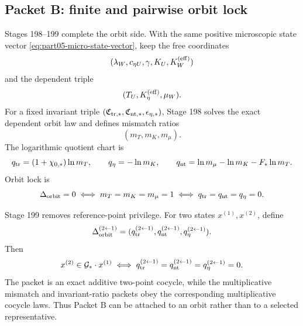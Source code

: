 \subsection{Packet B: finite and pairwise orbit lock}
Stages 198--199 complete the orbit side.  With the same positive microscopic state vector \eqref{eq:part05-micro-state-vector}, keep the free coordinates
\begin{equation}
\label{eq:part05-free-coords}
(\lambda_W,c_{\eta U},\gamma,K_U,K_W^{({\rm eff})})
\end{equation}
and the dependent triple
\begin{equation}
\label{eq:part05-dependent-triple}
(T_U,K_\eta^{({\rm eff})},\mu_W).
\end{equation}
For a fixed invariant triple \((\mathfrak C_{{\rm tr},*},\mathfrak C_{{\rm nt},*},\epsilon_{\eta,*})\), Stage 198 solves the exact dependent orbit law and defines mismatch ratios
\begin{equation}
\label{eq:part05-mismatch-triple}
(m_T,m_K,m_\mu).
\end{equation}
The logarithmic quotient chart is
\begin{equation}
\label{eq:part05-log-chart-mismatches}
q_{\rm tr}=(1+\chi_{0,*})\ln m_T,
\qquad
q_\eta=-\ln m_K,
\qquad
q_{\rm nt}=\ln m_\mu-\ln m_K-F_*\ln m_T.
\end{equation}
Orbit lock is
\begin{equation}
\label{eq:part05-single-orbit-lock}
\Delta_{\rm orbit}=0
\iff
m_T=m_K=m_\mu=1
\iff
q_{\rm tr}=q_{\rm nt}=q_\eta=0.
\end{equation}

Stage 199 removes reference-point privilege.  For two states \(x^{(1)},x^{(2)}\), define
\begin{equation}
\label{eq:part05-pairwise-q}
\Delta_{\rm orbit}^{(2\leftarrow1)}
=
(q_{\rm tr}^{(2\leftarrow1)},q_{\rm nt}^{(2\leftarrow1)},q_\eta^{(2\leftarrow1)}).
\end{equation}
Then
\begin{equation}
\label{eq:part05-two-point-orbit-lock}
x^{(2)}\in\mathcal G_*\cdot x^{(1)}
\iff
q_{\rm tr}^{(2\leftarrow1)}=q_{\rm nt}^{(2\leftarrow1)}=q_\eta^{(2\leftarrow1)}=0.
\end{equation}
The packet is an exact additive two-point cocycle, while the multiplicative mismatch and invariant-ratio packets obey the corresponding multiplicative cocycle laws.  Thus Packet B can be attached to an orbit rather than to a selected representative.

